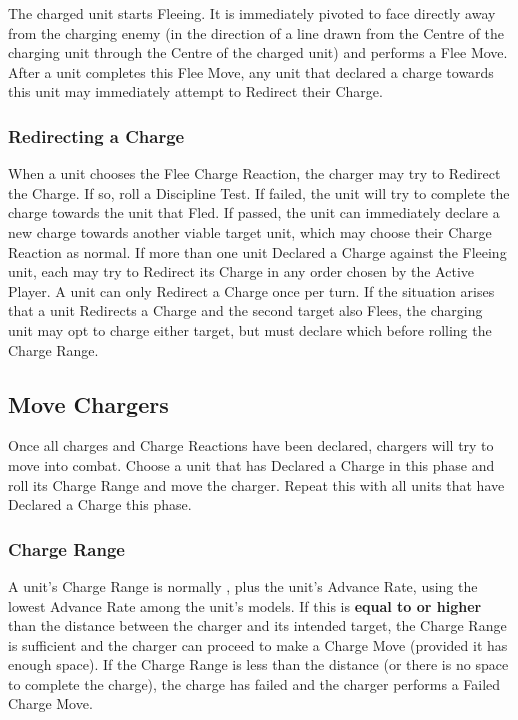 The charged unit starts Fleeing. It is immediately pivoted to face directly away from the charging enemy (in the direction of a line drawn from the Centre of the charging unit through the Centre of the charged unit) and performs a Flee Move. After a unit completes this Flee Move, any unit that declared a charge towards this unit may immediately attempt to Redirect their Charge.

\subsubsection{Redirecting a Charge}

When a unit chooses the Flee Charge Reaction, the charger may try to Redirect the Charge. If so, roll a Discipline Test. If failed, the unit will try to complete the charge towards the unit that Fled. If passed, the unit can immediately declare a new charge towards another viable target unit, which may choose their Charge Reaction as normal. If more than one unit Declared a Charge against the Fleeing unit, each may try to Redirect its Charge in any order chosen by the Active Player. A unit can only Redirect a Charge once per turn. If the situation arises that a unit Redirects a Charge and the second target also Flees, the charging unit may opt to charge either target, but must declare which before rolling the Charge Range.

\subsection{Move Chargers}
\label{move_chargers}

Once all charges and Charge Reactions have been declared, chargers will try to move into combat. Choose a unit that has Declared a Charge in this phase and roll its Charge Range and move the charger. Repeat this with all units that have Declared a Charge this phase.

\subsubsection{Charge Range}

A unit's Charge Range is normally , plus the unit's Advance Rate, using the lowest Advance Rate among the unit's models. If this is \textbf{equal to or higher} than the distance between the charger and its intended target, the Charge Range is sufficient and the charger can proceed to make a Charge Move (provided it has enough space). If the Charge Range is less than the distance (or there is no space to complete the charge), the charge has failed and the charger performs a Failed Charge Move.


